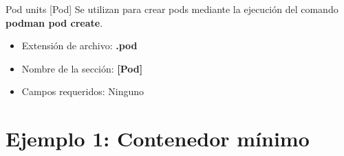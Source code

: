\begin{frame}[c]{Pod units [Pod]}
  Se utilizan para crear pods mediante la ejecución del
  comando \textbf{podman pod create}.
  \begin{itemize}
    \item Extensión de archivo: \textbf{.pod}
    \item Nombre de la sección: \textbf{[Pod]}
    \item Campos requeridos: Ninguno
  \end{itemize}
\end{frame}

\section{Ejemplo 1: Contenedor mínimo}

